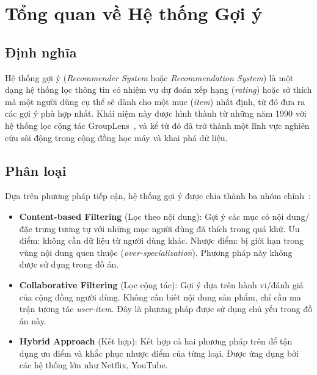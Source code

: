 \documentclass[../BTL.tex]{subfiles}
\begin{document}
\section{Tổng quan về Hệ thống Gợi ý}
\label{section:2.1}

\subsection{Định nghĩa}
\label{section:2.1.1}

Hệ thống gợi ý (\textit{Recommender System} hoặc \textit{Recommendation System}) là
một dạng hệ thống lọc thông tin có nhiệm vụ dự đoán xếp hạng (\textit{rating}) hoặc
sở thích mà một người dùng cụ thể sẽ dành cho một mục (\textit{item}) nhất định, từ
đó đưa ra các gợi ý phù hợp nhất. Khái niệm này được hình thành từ những năm 1990
với hệ thống lọc cộng tác GroupLens~\cite{resnick1994grouplens}, và kể từ đó đã trở
thành một lĩnh vực nghiên cứu sôi động trong cộng đồng học máy và khai phá dữ liệu.

\subsection{Phân loại}
\label{section:2.1.2}

Dựa trên phương pháp tiếp cận, hệ thống gợi ý được chia thành ba nhóm
chính~\cite{ricci2011recommender}:

\begin{itemize}[itemsep=0.4em]
    \item \textbf{Content-based Filtering} (Lọc theo nội dung): Gợi ý các mục có
    nội dung/đặc trưng tương tự với những mục người dùng đã thích trong quá khứ.
    Ưu điểm: không cần dữ liệu từ người dùng khác. Nhược điểm: bị giới hạn trong
    vùng nội dung quen thuộc (\textit{over-specialization}). Phương pháp này
    không được sử dụng trong đồ án.

    \item \textbf{Collaborative Filtering} (Lọc cộng tác): Gợi ý dựa trên
    hành vi/đánh giá của cộng đồng người dùng. Không cần biết nội dung sản phẩm,
    chỉ cần ma trận tương tác \textit{user-item}. Đây là phương pháp được sử dụng
    chủ yếu trong đồ án này.

    \item \textbf{Hybrid Approach} (Kết hợp): Kết hợp cả hai phương pháp trên để
    tận dụng ưu điểm và khắc phục nhược điểm của từng loại. Được ứng dụng bởi các
    hệ thống lớn như Netflix, YouTube.
\end{itemize}
\end{document}
